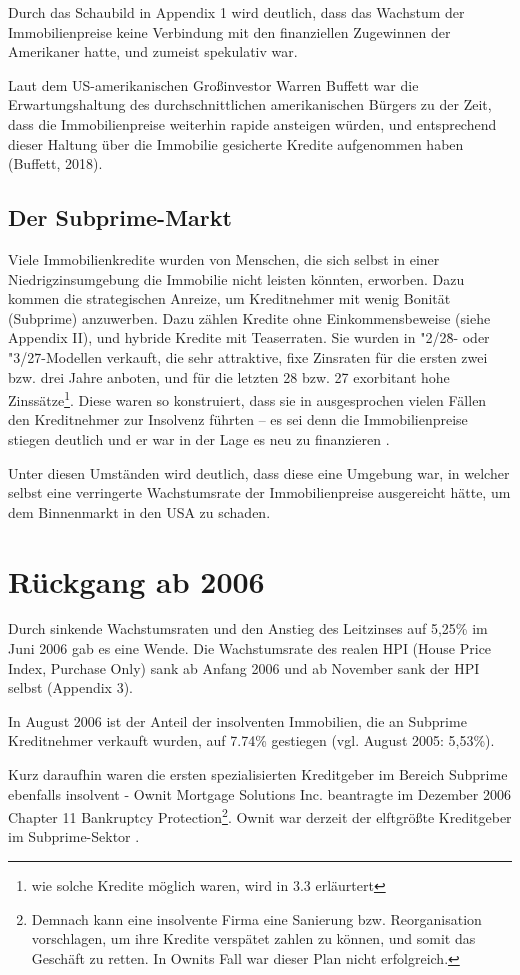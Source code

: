 \documentclass[a4paper,11pt]{report}
\begin{document}
Durch das Schaubild in Appendix 1 wird deutlich,
dass das Wachstum der Immobilienpreise keine Verbindung
mit den finanziellen Zugewinnen der Amerikaner hatte,
und zumeist spekulativ war. 

Laut dem US-amerikanischen
Großinvestor Warren Buffett war die Erwartungshaltung
des durchschnittlichen amerikanischen
B\"urgers zu der Zeit,
dass die Immobilienpreise weiterhin rapide ansteigen w\"urden,
und entsprechend dieser Haltung \"uber die Immobilie
gesicherte Kredite aufgenommen haben (Buffett, 2018).

\subsection{Der Subprime-Markt}
Viele Immobilienkredite wurden von Menschen, die sich selbst
in einer Niedrigzinsumgebung die Immobilie nicht leisten
k\"onnten, erworben.
Dazu kommen die strategischen Anreize, um Kreditnehmer
mit wenig Bonit\"at (Subprime) anzuwerben. Dazu z\"ahlen
Kredite ohne Einkommensbeweise (siehe Appendix II), 
und hybride Kredite mit Teaserraten. Sie wurden in "2/28\"\-- oder
"3/27\"\--Modellen verkauft, die sehr attraktive, fixe Zinsraten
f\"ur die ersten zwei bzw. drei Jahre anboten, und
f\"ur die letzten 28 bzw. 27 exorbitant hohe Zinss\"atze\footnote{
  wie solche Kredite m\"oglich waren, wird in 3.3 erl\"aurtert}.
Diese waren so konstruiert, dass sie in ausgesprochen vielen
F\"allen den Kreditnehmer zur Insolvenz f\"uhrten --
es sei denn die Immobilienpreise stiegen deutlich
und er war in der Lage es neu zu finanzieren
\parencite[S. 208]{acharyar}.

Unter diesen Umst\"anden wird deutlich, dass diese eine
Umgebung war, in welcher selbst eine verringerte Wachstumsrate
der Immobilienpreise ausgereicht h\"atte,
um dem Binnenmarkt in den USA zu schaden.

\section{R\"uckgang ab 2006}
Durch sinkende Wachstumsraten und den Anstieg des Leitzinses
auf 5,25\% im Juni 2006 gab es eine Wende.
Die Wachstumsrate des realen HPI (House Price Index,
Purchase Only) sank ab Anfang 2006 und
ab November sank der HPI selbst (Appendix 3).

In August 2006 ist der Anteil der insolventen
Immobilien, die an Subprime Kreditnehmer verkauft wurden,
auf 7.74\% gestiegen (vgl. August 2005: 5,53\%).

Kurz daraufhin waren die ersten spezialisierten
Kreditgeber im Bereich Subprime ebenfalls insolvent - 
Ownit Mortgage Solutions Inc. beantragte im Dezember 2006 Chapter 11
Bankruptcy Protection\footnote{Demnach kann eine insolvente
Firma eine Sanierung bzw. Reorganisation vorschlagen,
um ihre Kredite versp\"atet zahlen zu k\"onnen, und somit
das Gesch\"aft zu retten. In Ownits Fall war dieser Plan nicht
erfolgreich.}. Ownit war derzeit der elftgrößte Kreditgeber
im Subprime-Sektor \parencite{wsjdoss}.
\end{document}
